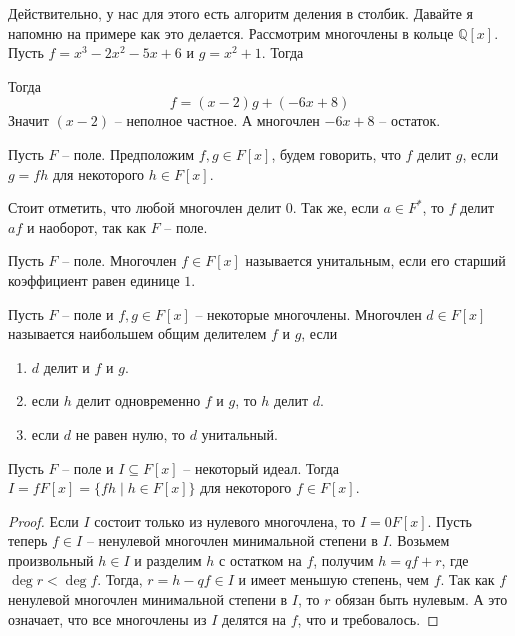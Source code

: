 Действительно, у нас для этого есть алгоритм деления в столбик.
Давайте я напомню на примере как это делается.
Рассмотрим многочлены в кольце $\mathbb Q[x]$.
Пусть $f = x^3 - 2x^2 - 5x + 6$ и $g = x^2 + 1$.
Тогда
\begin{center}
\end{center}
Тогда
\[
f = (x-2) g+ (-6 x + 8)
\]
Значит $(x - 2)$ -- неполное частное.
А многочлен $-6x + 8$ -- остаток.

\begin{definition}
Пусть $F$ -- поле.
Предположим $f, g\in F[x]$, будем говорить, что $f$ делит $g$, если $g = fh$ для некоторого $h\in F[x]$.
\end{definition}

Стоит отметить, что любой многочлен делит $0$.
Так же, если $a\in F^*$, то $f$ делит $af$ и наоборот, так как $F$ -- поле.

\begin{definition}
Пусть $F$ -- поле.
Многочлен $f\in F[x]$ называется унитальным, если его старший коэффициент равен единице $1$.
\end{definition}

\begin{definition}
Пусть $F$ -- поле и $f, g\in F[x]$ -- некоторые многочлены.
Многочлен $d\in F[x]$ называется наибольшем общим делителем $f$ и $g$, если
\begin{enumerate}
\item $d$ делит и $f$ и $g$.

\item если $h$ делит одновременно $f$ и $g$, то $h$ делит $d$.

\item если $d$ не равен нулю, то $d$ унитальный.
\end{enumerate}
\end{definition}


\begin{claim}
\label{claim::PolyIdeals}
Пусть $F$ -- поле и $I\subseteq F[x]$ -- некоторый идеал.
Тогда $I = f F[x] = \{fh\mid h\in F[x]\}$ для некоторого $f\in F[x]$.
\end{claim}
\begin{proof}
Если $I$ состоит только из нулевого многочлена, то $I = 0 F[x]$.
Пусть теперь $f\in I$ -- ненулевой многочлен минимальной степени в $I$.
Возьмем произвольный $h\in I$ и разделим $h$ с остатком на $f$, получим $h = qf + r$, где $\deg r < \deg f$.
Тогда, $r = h - qf \in I$ и имеет меньшую степень, чем $f$.
Так как $f$ ненулевой многочлен минимальной степени в $I$, то $r$ обязан быть нулевым.
А это означает, что все многочлены из $I$ делятся на $f$, что и требовалось.
\end{proof}

